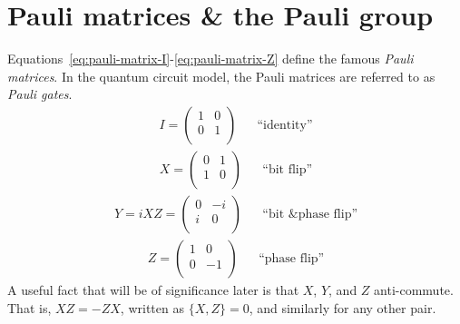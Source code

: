 \section{Pauli matrices \& the Pauli group}\label{sec:errors}

Equations~\ref{eq:pauli-matrix-I}-\ref{eq:pauli-matrix-Z} define the famous \textit{Pauli matrices}. In the quantum circuit model, the Pauli matrices are referred to as \textit{Pauli gates}.
\begin{equation}\label{eq:pauli-matrix-I}
    \begin{aligned}
        I = \begin{pmatrix}
            1 & 0 \\
            0 & 1 \\
        \end{pmatrix} & & \text{``identity''}
    \end{aligned}
\end{equation}
\begin{equation}\label{eq:pauli-matrix-X}
    \begin{aligned}
        X = \begin{pmatrix}
            0 & 1 \\
            1 & 0 \\
        \end{pmatrix} & & \text{``bit flip''}
    \end{aligned}
\end{equation}
\begin{equation}\label{eq:pauli-matrix-Y}
    \begin{aligned}
        Y = iXZ = \begin{pmatrix}
            0 & -i \\
            i & 0 \\
        \end{pmatrix} & & \text{``bit \& phase flip''}
    \end{aligned}
\end{equation}
\begin{equation}\label{eq:pauli-matrix-Z}
    \begin{aligned}
        Z = \begin{pmatrix}
            1 & 0 \\
            0 & -1 \\
        \end{pmatrix} & & \text{``phase flip''}
    \end{aligned}
\end{equation}
A useful fact that will be of significance later is that $X$, $Y$, and $Z$ anti-commute. That is, ${XZ = -ZX}$, written as $\{X, Z\} = 0$, and similarly for any other pair.

